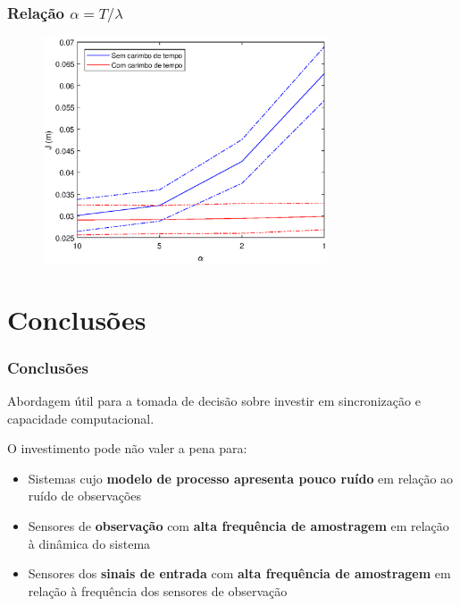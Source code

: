 \documentclass{beamer}
\renewcommand{\(}{\left(}
\renewcommand{\)}{\right)}
\renewcommand{\[}{\left[}
\renewcommand{\]}{\right]}
\begin{document}
\begin{frame}
	\frametitle{Relação $\alpha = T/\lambda$}
	
	\begin{figure}
		\centering
		\includegraphics[width=0.75\textwidth]{images/dtudty.eps}
	\end{figure}

\end{frame}



\section{Conclusões} 

\begin{frame}
	\frametitle{Conclusões}
Abordagem útil para a tomada de decisão sobre investir em sincronização e capacidade computacional.
\vspace{0.2cm}

O investimento pode não valer a pena para:
	
	\begin{itemize}
		\item Sistemas cujo \textbf{modelo de processo apresenta pouco ruído} em relação ao ruído de observações 
		\item Sensores de \textbf{observação} com \textbf{alta frequência de amostragem} em relação à dinâmica do sistema
		\item Sensores dos \textbf{sinais de entrada} com \textbf{alta frequência de amostragem} em relação à frequência dos sensores de observação
	\end{itemize}

\end{frame}
\end{document}
